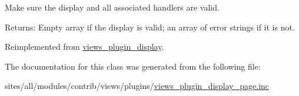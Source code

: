 Make sure the display and all associated handlers are valid.

\begin{Desc}
\item[Returns:]Empty array if the display is valid; an array of error strings if it is not. \end{Desc}


Reimplemented from \hyperlink{classviews__plugin__display_3282edb1b32b756937fe2d0c8757c80c}{views\_\-plugin\_\-display}.

The documentation for this class was generated from the following file:\begin{CompactItemize}
\item 
sites/all/modules/contrib/views/plugins/\hyperlink{views__plugin__display__page_8inc}{views\_\-plugin\_\-display\_\-page.inc}\end{CompactItemize}
